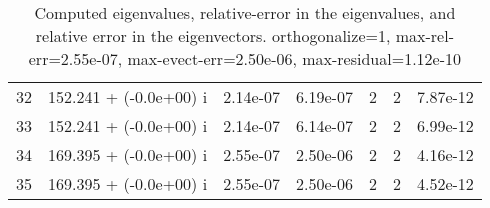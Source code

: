 \begin{table}[H]
\begin{center}
\begin{tabular}{|c|c|c|c|c|c|c|}
    32  &    152.241 + (-0.0e+00) i  &    2.14e-07      &   6.19e-07    &   2    &  2   &    7.87e-12 \\
    33  &    152.241 + (-0.0e+00) i  &    2.14e-07      &   6.14e-07    &   2    &  2   &    6.99e-12 \\
    34  &    169.395 + (-0.0e+00) i  &    2.55e-07      &   2.50e-06    &   2    &  2   &    4.16e-12 \\
    35  &    169.395 + (-0.0e+00) i  &    2.55e-07      &   2.50e-06    &   2    &  2   &    4.52e-12 \\
\hline
\end{tabular}
\caption{Computed eigenvalues, relative-error in the eigenvalues, and relative error in the eigenvectors. orthogonalize=1, max-rel-err=2.55e-07, max-evect-err=2.50e-06, max-residual=1.12e-10
}\label{table:genEigssice16.order4.ng3.hdf}
\end{center}
\end{table}
